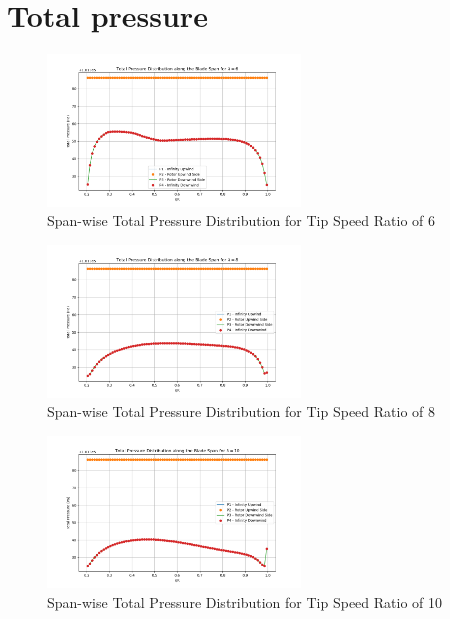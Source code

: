 \section{Total pressure}
\begin{figure}[H]
    \centering
    \includegraphics[width=0.6\textwidth]{Figures/pres_total_6.png}
    \caption{Span-wise Total Pressure Distribution for Tip Speed Ratio of 6}
    \label{fig:span-wise total pressure distribution - lambda 6}
\end{figure}
\begin{figure}[H]
    \centering
    \includegraphics[width=0.6\textwidth]{Figures/pres_total_8.png}
    \caption{Span-wise Total Pressure Distribution for Tip Speed Ratio of 8}
    \label{fig:span-wise total pressure distribution - lambda 8}
\end{figure}
\begin{figure}[H]
    \centering
    \includegraphics[width=0.6\textwidth]{Figures/pres_total_10.png}
    \caption{Span-wise Total Pressure Distribution for Tip Speed Ratio of 10}
    \label{fig:span-wise total pressure distribution - lambda 10}
\end{figure}

